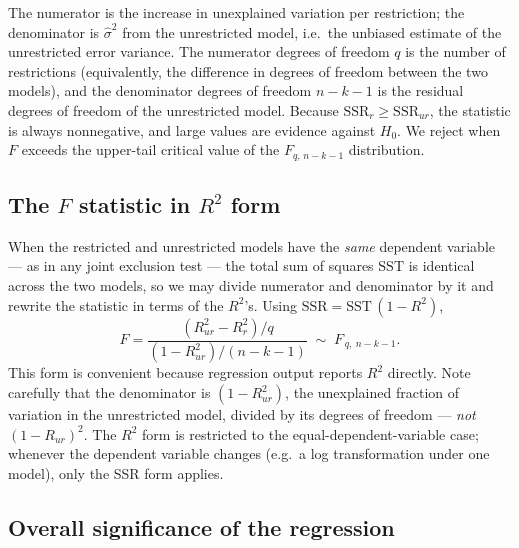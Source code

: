 The numerator is the increase in unexplained variation per restriction; the denominator is $\widehat\sigma^2$ from the unrestricted model, i.e.\ the unbiased estimate of the unrestricted error variance. The numerator degrees of freedom $q$ is the number of restrictions (equivalently, the difference in degrees of freedom between the two models), and the denominator degrees of freedom $n-k-1$ is the residual degrees of freedom of the unrestricted model. Because $\text{SSR}_r\ge\text{SSR}_{ur}$, the statistic is always nonnegative, and large values are evidence against $H_0$. We reject when $F$ exceeds the upper-tail critical value of the $F_{q,\,n-k-1}$ distribution.


\subsection{The $F$ statistic in $R^2$ form}

When the restricted and unrestricted models have the \emph{same} dependent variable --- as in any joint exclusion test --- the total sum of squares $\text{SST}$ is identical across the two models, so we may divide numerator and denominator by it and rewrite the statistic in terms of the $R^2$'s. Using $\text{SSR} = \text{SST}\,(1-R^2)$,
\[
F = \frac{(R_{ur}^2 - R_r^2)/q}{(1 - R_{ur}^2)/(n-k-1)} \;\sim\; F_{\,q,\ n-k-1}.
\]
This form is convenient because regression output reports $R^2$ directly. Note carefully that the denominator is $(1 - R_{ur}^2)$, the unexplained fraction of variation in the unrestricted model, divided by its degrees of freedom --- \emph{not} $(1-R_{ur})^2$. The $R^2$ form is restricted to the equal-dependent-variable case; whenever the dependent variable changes (e.g.\ a log transformation under one model), only the SSR form applies.

\subsection{Overall significance of the regression}

